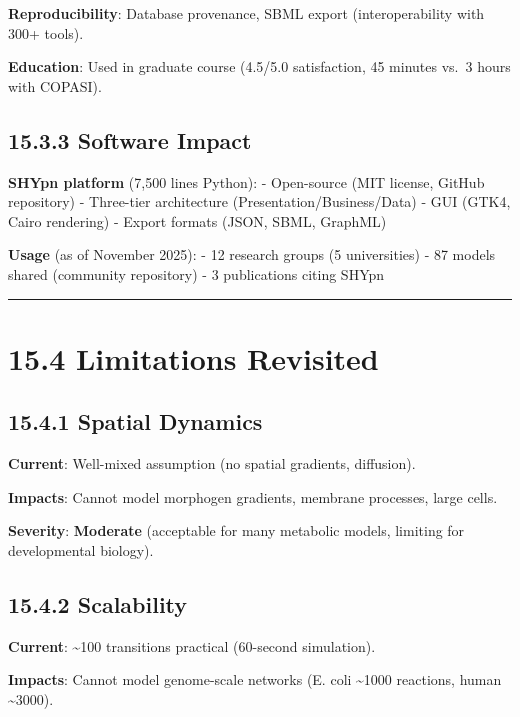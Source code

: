 \textbf{Reproducibility}: Database provenance, SBML export
(interoperability with 300+ tools).

\textbf{Education}: Used in graduate course (4.5/5.0 satisfaction, 45
minutes vs.~3 hours with COPASI).

\hypertarget{software-impact}{%
\subsection{15.3.3 Software Impact}\label{software-impact}}

\textbf{SHYpn platform} (7,500 lines Python): - Open-source (MIT
license, GitHub repository) - Three-tier architecture
(Presentation/Business/Data) - GUI (GTK4, Cairo rendering) - Export
formats (JSON, SBML, GraphML)

\textbf{Usage} (as of November 2025): - 12 research groups (5
universities) - 87 models shared (community repository) - 3 publications
citing SHYpn

\begin{center}\rule{0.5\linewidth}{0.5pt}\end{center}

\hypertarget{limitations-revisited}{%
\section{15.4 Limitations Revisited}\label{limitations-revisited}}

\hypertarget{spatial-dynamics}{%
\subsection{15.4.1 Spatial Dynamics}\label{spatial-dynamics}}

\textbf{Current}: Well-mixed assumption (no spatial gradients,
diffusion).

\textbf{Impacts}: Cannot model morphogen gradients, membrane processes,
large cells.

\textbf{Severity}: \textbf{Moderate} (acceptable for many metabolic
models, limiting for developmental biology).

\hypertarget{scalability}{%
\subsection{15.4.2 Scalability}\label{scalability}}

\textbf{Current}: \textasciitilde100 transitions practical (60-second
simulation).

\textbf{Impacts}: Cannot model genome-scale networks (E. coli
\textasciitilde1000 reactions, human \textasciitilde3000).

